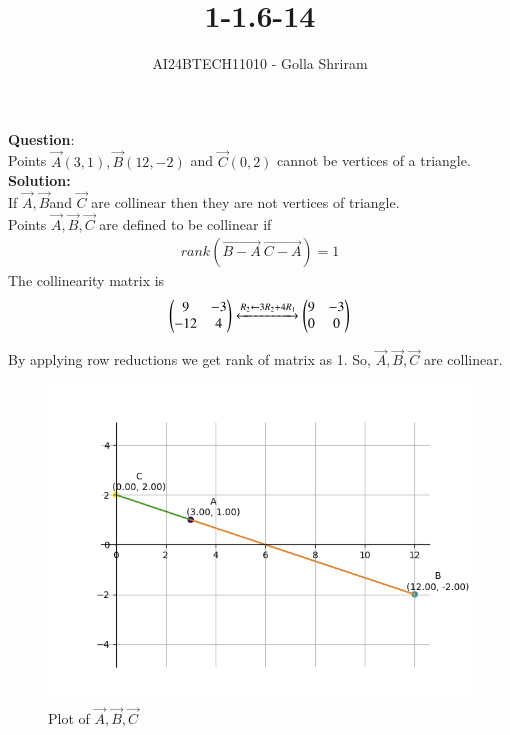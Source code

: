 \documentclass[journal]{IEEEtran}
\begin{document}

\vspace{3cm}

\title{1-1.6-14}
\author{AI24BTECH11010  - Golla Shriram
}
{\let\newpage\relax\maketitle}

\renewcommand{\thefigure}{\theenumi}
\renewcommand{\thetable}{\theenumi}
\setlength{\intextsep}{10pt} %


\renewcommand{\thetable}{\theenumi}


\textbf{Question}:\\
     Points $\vec{A}(3,1), \vec{B}(12,-2)$  and $ \vec{C}(0,2) $ cannot be vertices of a triangle.  \\
\textbf{Solution: } \\
       If $\vec{A},\vec{B}$and $\vec{C}$ are collinear then they are not vertices of triangle.  \\
  Points $\vec{A},\vec{B},\vec{C} $ are defined to be collinear if \\
                                 \begin{align}  rank(\vec{B-A}  \  \vec{C-A} ) = 1 \end{align}
                                 The collinearity matrix  is \\
                          \begin{align}       \begin{pmatrix}9 & -3 
                                 \\ -12 & 4\end{pmatrix} 
                                  \xleftrightarrow[]{R_2 \leftarrow {3R_2+4R_1}}
 \begin{pmatrix}
   9 & -3 
   \\
   0 & 0
 \end{pmatrix}
 \end{align}
 
 By applying row reductions we get rank of matrix as 1. So, $\vec{A},\vec{B},\vec{C} $ are collinear.
\begin{figure}[h!]
   \centering
   \includegraphics[width=0.7\linewidth]{figs/Figure_1.png}
	\caption{Plot of $\vec{A},\vec{B},\vec{C}$}
   \label{stemplot}
\end{figure}
\end{document}
